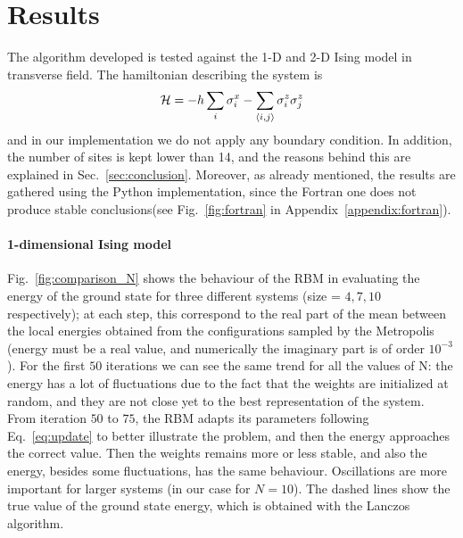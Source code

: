 \documentclass[a4paper,11pt]{article}
\begin{document}

\section{Results}
\label{sec:results}

The algorithm developed is tested against the 1-D and 2-D Ising model in transverse field. The hamiltonian describing the system is
\begin{equation}
    \centering
    \label{eq:ising}
     \mathcal{H}= -h \sum_i \sigma_i^x - \sum_{\langle i,j \rangle} \sigma_i^z \sigma_j^z
\end{equation}
and in our implementation we do not apply any boundary condition. In addition, the number of sites is kept lower than 14, and the reasons behind this are explained in Sec.~\ref{sec:conclusion}. Moreover, as already mentioned, the results are gathered using the Python implementation, since the Fortran one does not produce stable conclusions(see Fig.~\ref{fig:fortran} in Appendix~\ref{appendix:fortran}). 

\paragraph{1-dimensional Ising model}

Fig.~\ref{fig:comparison_N} shows the behaviour of the RBM in evaluating the energy of the ground state for three different systems (size = $4,7,10$ respectively); at each step, this correspond to the real part of the mean between the local energies obtained from the configurations sampled by the Metropolis (energy must be a real value, and numerically the imaginary part is of order $10^{-3}$). For the first $50$ iterations we can see the same trend for all the values of N: the energy has a lot of fluctuations due to the fact that the weights are initialized at random, and they are not close yet to the best representation of the system. From iteration $50$ to $75$, the RBM adapts its parameters following Eq.~\ref{eq:update} to better illustrate the problem, and then the energy approaches the correct value. Then the weights remains more or less stable, and also the energy, besides some fluctuations, has the same behaviour. Oscillations are more important for larger systems (in our case for $N = 10$). The dashed lines show the true value of the ground state energy, which is obtained with the Lanczos algorithm.
\end{document}
